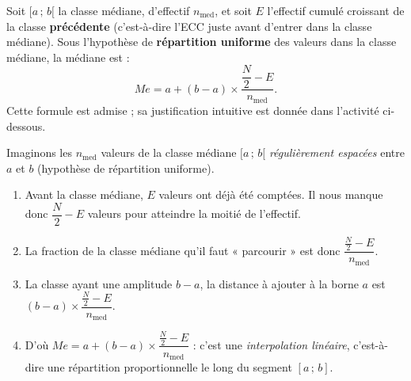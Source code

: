 \documentclass[11pt]{article}
\begin{document}
\begin{propriete}
Soit $[a\,;\,b[$ la classe médiane, d'effectif $n_{\text{med}}$, et soit $E$ l'effectif cumulé croissant de la classe \textbf{précédente} (c'est-à-dire l'ECC juste avant d'entrer dans la classe médiane). Sous l'hypothèse de \textbf{répartition uniforme} des valeurs dans la classe médiane, la médiane est :
\[ Me = a + (b-a)\times \frac{\dfrac{N}{2} - E}{n_{\text{med}}}. \]
Cette formule est admise ; sa justification intuitive est donnée dans l'activité ci-dessous.
\end{propriete}

\begin{experience}
Imaginons les $n_{\text{med}}$ valeurs de la classe médiane $[a\,;\,b[$ \emph{régulièrement espacées} entre $a$ et $b$ (hypothèse de répartition uniforme).
\begin{enumerate}
\item Avant la classe médiane, $E$ valeurs ont déjà été comptées. Il nous manque donc $\dfrac{N}{2} - E$ valeurs pour atteindre la moitié de l'effectif.
\item La fraction de la classe médiane qu'il faut « parcourir » est donc $\dfrac{\frac{N}{2} - E}{n_{\text{med}}}$.
\item La classe ayant une amplitude $b - a$, la distance à ajouter à la borne $a$ est $(b-a)\times \dfrac{\frac{N}{2} - E}{n_{\text{med}}}$.
\item D'où $Me = a + (b-a)\times \dfrac{\frac{N}{2} - E}{n_{\text{med}}}$ : c'est une \emph{interpolation linéaire}, c'est-à-dire une répartition proportionnelle le long du segment $[a\,;\,b]$.
\end{enumerate}
\end{experience}
\end{document}
